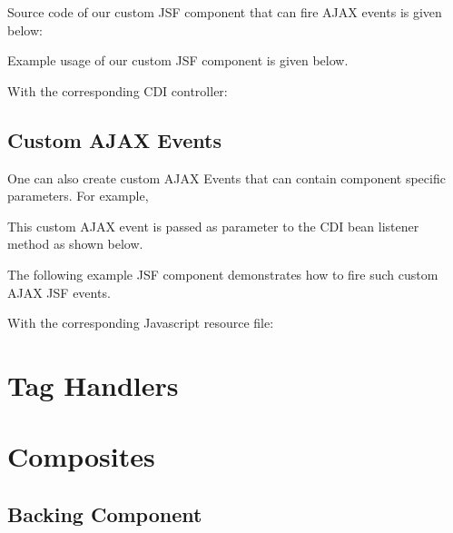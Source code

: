 Source code of our custom JSF component that can fire AJAX events is given below:


Example usage of our custom JSF component is given below.


With the corresponding CDI controller:


\subsection{Custom AJAX Events}

One can also create custom AJAX Events that can contain component specific parameters.
For example,


This custom AJAX event is passed as parameter to the CDI bean listener method as shown below.


The following example JSF component demonstrates how to fire such custom AJAX JSF events.


With the corresponding Javascript resource file:


\section{Tag Handlers}

\section{Composites}

\subsection{Backing Component}